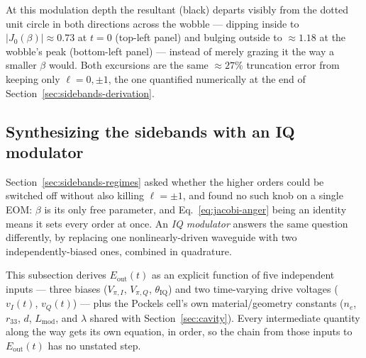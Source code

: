 \documentclass[9pt]{article}
\begin{document}
At this modulation depth the resultant (black) departs visibly from the
dotted unit circle in both directions across the wobble --- dipping inside
to $|J_0(\beta)|\approx0.73$ at $t=0$ (top-left panel) and bulging outside
to $\approx1.18$ at the wobble's peak (bottom-left panel) --- instead of
merely grazing it the way a smaller $\beta$ would. Both excursions are the
same $\approx27\%$ truncation error from keeping only $\ell=0,\pm1$, the one
quantified numerically at the end of Section~\ref{sec:sidebands-derivation}.

\subsection{Synthesizing the sidebands with an IQ modulator}
\label{sec:sidebands-iq-modulator}
Section~\ref{sec:sidebands-regimes} asked whether the higher orders could be
switched off without also killing $\ell=\pm1$, and found no such knob on a
single EOM: $\beta$ is its only free parameter, and Eq.~\eqref{eq:jacobi-anger}
being an identity means it sets every order at once. An \emph{IQ modulator}
answers the same question differently, by replacing one nonlinearly-driven
waveguide with two independently-biased ones, combined in quadrature.

This subsection derives $E_{\mathrm{out}}(t)$ as an explicit function of
five independent inputs --- three biases ($V_{\pi,I}$, $V_{\pi,Q}$,
$\theta_{\mathrm{IQ}}$) and two time-varying drive voltages ($v_I(t)$,
$v_Q(t)$) --- plus the Pockels cell's own material/geometry constants
($n_e$, $r_{33}$, $d$, $L_{\mathrm{mod}}$, and $\lambda$ shared with
Section~\ref{sec:cavity}). Every intermediate quantity along the way gets
its own equation, in order, so the chain from those inputs to
$E_{\mathrm{out}}(t)$ has no unstated step.
\end{document}
